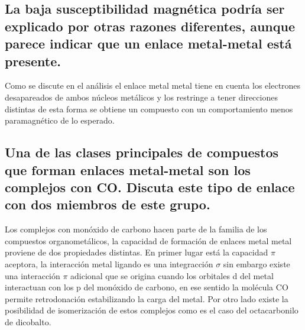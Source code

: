 \documentclass[fleqn,10pt]{SelfArx} %
\begin{document}
	\subsection{La baja susceptibilidad magn\'etica podr\'ia ser explicado por otras razones diferentes, aunque parece indicar que un enlace metal-metal est\'a presente.}
	Como se discute en el an\'alisis el enlace metal metal tiene en cuenta los electrones desapareados de ambos n\'ucleos met\'alicos y los restringe a tener direcciones distintas de esta forma se obtiene un compuesto con un comportamiento menos paramagn\'etico de lo esperado.
	
	\subsection{Una de las clases principales de compuestos que forman enlaces metal-metal son los complejos con CO. Discuta este tipo de enlace con dos miembros de este grupo.}
	Los complejos con mon\'oxido de carbono hacen parte de la familia de los compuestos organomet\'alicos, la capacidad de formaci\'on de enlaces metal metal proviene de dos propiedades distintas. En primer lugar est\'a la capacidad $\pi$ aceptora, la interacci\'on metal ligando es una integracci\'on $\sigma$ sin embargo existe una interacci\'on $\pi$ adicional que se origina cuando los orbitales d del metal interactuan con los p del mon\'oxido de carbono, en ese sentido la mol\'ecula CO permite retrodonaci\'on estabilizando la carga del metal. Por otro lado existe la posibilidad de isomerizaci\'on de estos complejos como es el caso del octacarbonilo de dicobalto.
\end{document}
